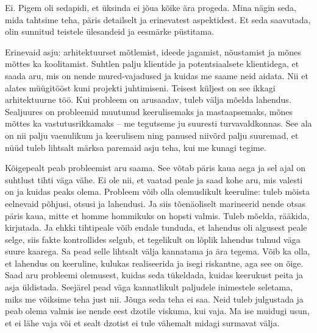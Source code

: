 
Ei. Pigem oli sedapidi, et üksinda ei jõua kõike ära progeda. Mina nägin seda, mida 
tahtsime teha, päris detailselt ja erinevatest aspektidest. Et seda saavutada, olin sunnitud teistele ülesandeid ja 
eesmärke püstitama.


Erinevaid asju: arhitektuurset mõtlemist, ideede jagamist, nõustamist ja mõnes mõttes ka koolitamist. Suhtlen palju 
klientide ja potentsiaalsete klientidega, et saada aru, mis on nende mured-vajadused ja kuidas me saame neid aidata. Nii et alates müügitööst kuni projekti 
juhtimiseni. Teisest küljest on see ikkagi arhitektuurne töö. Kui probleem on  
arusaadav, tuleb välja mõelda lahendus. Sealjuures on probleemid muutunud keerulisemaks ja 
mastaapsemaks, mõnes mõttes ka vastutusrikkamaks -- me  
tegutseme ju suuresti turvavaldkonnas. See ala on nii palju 
vaenulikum ja keerulisem ning panused niivõrd palju suuremad, et nüüd tuleb
lihtsalt märksa paremaid asju teha, kui me kunagi tegime.


Kõigepealt peab probleemist aru saama. See võtab päris kaua aega ja sel ajal on suhtlust tihti väga vähe. Ei ole nii, et vaatad peale ja 
saad kohe aru, mis valesti on ja kuidas peaks olema. Probleem võib olla olemuslikult keeruline: tuleb mõista eelnevaid põhjusi, otsusi ja lahendusi. 
Ja siis tõenäoliselt marineerid nende 
otsas päris kaua, mitte et homme hommikuks on hopsti valmis. Tuleb mõelda, rääkida, kirjutada. Ja ehkki tihtipeale võib endale tunduda, et 
lahendus oli algusest peale selge, siis fakte kontrollides 
selgub, et tegelikult on lõplik lahendus tulnud väga suure kaarega. Sa pead selle lihtsalt välja kannatama ja ära tegema. Võib ka olla, et lahendus on keeruline, kulukas 
realiseerida ja isegi riskantne, aga see on õige. Saad aru probleemi olemusest, kuidas seda 
tükeldada, kuidas keerukust peita ja asja üldistada. Seejärel 
pead väga kannatlikult paljudele inimestele seletama, miks me võiksime teha 
just nii. Jõuga seda teha ei saa. Neid tuleb julgustada ja peab olema 
valmis ise nende eest dzotile viskuma, kui vaja. Ma ise muidugi usun, 
et ei lähe vaja või et sealt dzotist ei tule vähemalt midagi surmavat välja.
